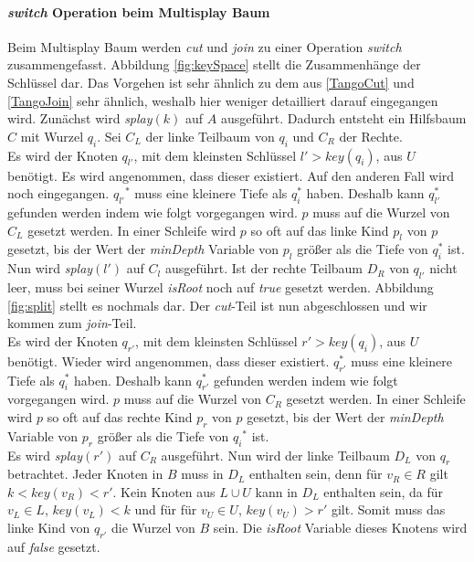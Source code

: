 \documentclass[a4paper,12pt]{article}
\begin{document}
\paragraph{\textit{switch} Operation beim Multisplay Baum}
Beim Multisplay Baum werden \textit{cut} und \textit{join} zu einer Operation \textit{switch} zusammengefasst. Abbildung \ref{fig:keySpace} stellt die Zusammenhänge der Schlüssel dar. Das Vorgehen ist sehr ähnlich zu dem aus \ref{TangoCut} und  \ref{TangoJoin} sehr ähnlich, weshalb hier weniger detailliert darauf eingegangen wird.
Zunächst wird \textit{splay}$\left(k\right)$ auf $A$ ausgeführt. Dadurch entsteht ein Hilfsbaum $C$ mit Wurzel $q_i$. Sei $C_L$ der linke Teilbaum von $q_i$ und $C_R$ der Rechte.\\
 Es wird der Knoten $q_{l'}$, mit dem kleinsten Schlüssel $l' > \textit{key}\left(q_i\right)$, aus $U$ benötigt. Es wird angenommen, dass dieser existiert. Auf den anderen Fall wird noch eingegangen. ${q_{l'}}^*$ muss eine kleinere Tiefe als  $q_i^*$ haben. Deshalb kann $q_{l'}^*$ gefunden werden indem  wie folgt vorgegangen wird. $p$ muss auf die Wurzel von $C_L$ gesetzt werden. In einer Schleife wird $p$ so oft auf das linke Kind $p_l$ von $p$ gesetzt, bis der Wert der \textit{minDepth} Variable von $p_l$ größer als die Tiefe von $q_i^*$  ist.\\
 Nun wird \textit{splay}$\left(l'\right)$ auf $C_l$ ausgeführt. Ist der rechte Teilbaum $D_R$ von $q_{l'}$ nicht leer,  muss bei seiner Wurzel \textit{isRoot} noch auf \textit{true} gesetzt werden. Abbildung \ref{fig:split} stellt es nochmals dar. Der \textit{cut}-Teil ist nun abgeschlossen und wir kommen zum \textit{join}-Teil. \\
 Es wird der Knoten $q_{r'}$, mit dem kleinsten Schlüssel $r' > \textit{key}\left(q_i\right)$, aus $U$ benötigt. Wieder wird angenommen, dass dieser existiert.  $q_{r'}^*$ muss eine kleinere Tiefe als  $q_i^*$ haben. Deshalb kann $q_{r'}^*$ gefunden werden indem  wie folgt vorgegangen wird. $p$ muss auf die Wurzel von $C_R$ gesetzt werden. In einer Schleife wird $p$ so oft auf das rechte Kind $p_r$ von $p$ gesetzt, bis der Wert der \textit{minDepth} Variable von $p_r$ größer als die Tiefe von ${q_i}^*$  ist.\\
 Es wird \textit{splay}$\left(r'\right)$ auf $C_R$ ausgeführt. Nun wird der linke Teilbaum $D_L$ von $q_r$ betrachtet. Jeder Knoten in $B$ muss in $D_L$ enthalten sein, denn für $v_R \in R$ gilt $k < \mathit{key}\left(v_R\right) < r'$. Kein Knoten aus $L \cup U$ kann in $D_L$ enthalten sein, da für $v_L \in  L$,  $ \mathit{key}\left(v_L\right) < k$ und für  für $v_U \in  U$,  $ \mathit{key}\left(v_U\right) > r'$ gilt. Somit muss das linke Kind von $q_{r'}$ die Wurzel von $B$ sein. Die \textit{isRoot} Variable dieses Knotens wird auf \textit{false} gesetzt.
\end{document}
